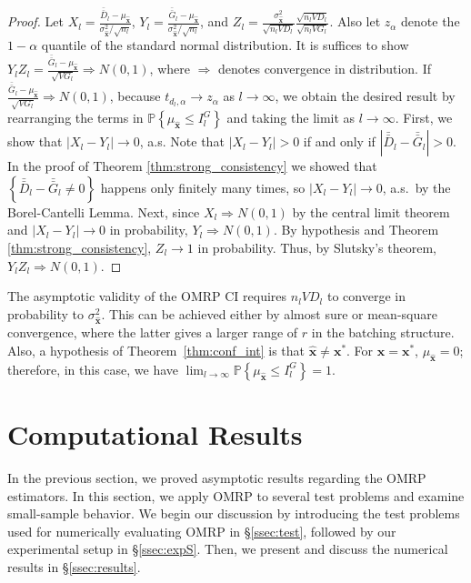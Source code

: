 \documentclass[12pt]{article}
\newcommand{\p}[1]{\mathbb{P} \left\{ #1 \right\}}
\newcommand{\x}{\mathbf{x}}
\newcommand{\xh}{{\hat{\x}}}
\newcommand{\xs}{\x^*}
\newcommand{\gb}{\bar{G}}
\newcommand{\gbb}{\bar{\gb}}
\newcommand{\db}{\bar{D}}
\newcommand{\dbb}{\bar{\db}}
\begin{document}
\begin{proof} 
			Let $X_l = \frac{\dbb_l - \mu_\xh}{\sigma^2_\xh/\sqrt{n_l}}$, $Y_l = \frac{\gbb_l - \mu_\xh}{\sigma^2_\xh/\sqrt{n_l}}$, and $Z_l = \frac{\sigma^2_\xh}{\sqrt{n_lVD_l}} \frac{\sqrt{n_lVD_l}}{\sqrt{n_lVG_l}}$. 
			Also let $z_{\alpha}$ denote the $1-\alpha$ quantile of the standard normal distribution. 
        It is suffices to show $Y_lZ_l = \frac{\gbb_l - \mu_\xh}{\sqrt{VG_l}} \Rightarrow N(0,1)$, where $\Rightarrow$ denotes convergence in distribution.
			If $\frac{\gbb_l - \mu_\xh}{\sqrt{VG_l}} \Rightarrow N(0,1)$, because $t_{d_l,\alpha} \rightarrow z_{\alpha}$ as $l \rightarrow \infty$, we obtain the desired result by rearranging the terms in $\p{\mu_\xh \leq I^G_l}$ and taking the limit as $l \rightarrow \infty$.
        First, we show that $|X_l - Y_l| \rightarrow 0$, a.s.  Note that $|X_l - Y_l| > 0$ if and only if $|\dbb_l - \gbb_l| > 0$.  
        In the proof of Theorem \ref{thm:strong_consistency} we showed that $\left\{ \dbb_l - \gbb_l \neq 0 \right\}$ happens only finitely many times, so $|X_l - Y_l| \rightarrow 0$, a.s.\ by the Borel-Cantelli Lemma. 
        Next, since $X_l \Rightarrow N(0,1)$  by the central limit theorem and $|X_l - Y_l| \rightarrow 0$ in probability, $Y_l \Rightarrow N(0,1)$.  
        By hypothesis and Theorem \ref{thm:strong_consistency}, $Z_l \rightarrow 1$ in probability.  
        Thus, by Slutsky's theorem, $Y_lZ_l \Rightarrow N(0,1)$.
\end{proof}

The asymptotic validity of the OMRP CI requires $n_l VD_l$ to converge in probability to $\sigma^{2}_{\xh}$. 
This can be achieved either by almost sure or mean-square convergence, where the latter gives a larger range of $r$ in the batching structure.
Also, a hypothesis of Theorem~\ref{thm:conf_int} is that $\xh \neq \xs$.  
For $\xh = \xs$, $\mu_\xh = 0$; therefore, in this case, we have $\lim_{l\rightarrow\infty} \p{\mu_\xh \leq I^G_l} = 1$. 

\section{Computational Results}
\label{sec:comp}

In the previous section, we proved asymptotic results regarding the OMRP estimators. 
In this section, we apply OMRP to several test problems and examine small-sample behavior. 
We begin our discussion by introducing the test problems used for numerically evaluating OMRP in \S \ref{ssec:test}, followed by our experimental setup in \S \ref{ssec:expS}. Then, we present and discuss the numerical results in \S \ref{ssec:results}. 
\end{document}
